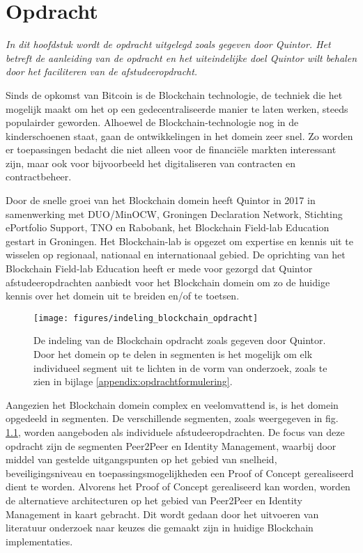 \chapter{Opdracht}

\textit{In dit hoofdstuk wordt de opdracht uitgelegd zoals gegeven door Quintor. Het betreft de aanleiding van de opdracht en het uiteindelijke doel Quintor wilt behalen door het faciliteren van de afstudeeropdracht.}

Sinds de opkomst van Bitcoin is de Blockchain technologie, de techniek die het mogelijk maakt om het op een gedecentraliseerde manier te laten werken, steeds populairder geworden. Alhoewel de Blockchain-technologie nog in de kinderschoenen staat, gaan de ontwikkelingen in het domein zeer snel. Zo worden er toepassingen bedacht die niet alleen voor de financiële markten interessant zijn, maar ook voor bijvoorbeeld het digitaliseren van contracten en contractbeheer. 

Door de snelle groei van het Blockchain domein heeft Quintor in 2017 in samenwerking met DUO/MinOCW, Groningen Declaration Network, Stichting ePortfolio Support, TNO en Rabobank, het Blockchain Field-lab Education gestart in Groningen. Het Blockchain-lab is opgezet om expertise en kennis uit te wisselen op regionaal, nationaal en internationaal gebied. De oprichting van het Blockchain Field-lab Education heeft er mede voor gezorgd dat Quintor afstudeeropdrachten aanbiedt voor het Blockchain domein om zo de huidige kennis over het domein uit te breiden en/of te toetsen.

\begin{figure}[h]
  \centering
  \texttt{[image: figures/indeling\_blockchain\_opdracht]}
  \caption[Indeling opdracht Blockchain Quintor.]{
    De indeling van de Blockchain opdracht zoals gegeven door Quintor. Door het domein op te delen in segmenten is het mogelijk om elk individueel segment uit te lichten in de vorm van onderzoek, zoals te zien in bijlage \ref{appendix:opdrachtformulering}.
  }
  \label{fig:indeling_blockchain_opdracht} 
\end{figure}

\clearpage
Aangezien het Blockchain domein complex en veelomvattend is, is het domein opgedeeld in segmenten. De verschillende segmenten, zoals weergegeven in fig. \ref{fig:indeling_blockchain_opdracht}, worden aangeboden als individuele afstudeeropdrachten. De focus van deze opdracht zijn de segmenten Peer2Peer en Identity Management, waarbij door middel van gestelde uitgangspunten op het gebied van snelheid, beveiligingsniveau en toepassingsmogelijkheden een Proof of Concept gerealiseerd dient te worden. Alvorens het Proof of Concept gerealiseerd kan worden, worden de alternatieve architecturen op het gebied van Peer2Peer en Identity Management in kaart gebracht. Dit wordt gedaan door het uitvoeren van literatuur onderzoek naar keuzes die gemaakt zijn in huidige Blockchain implementaties.

